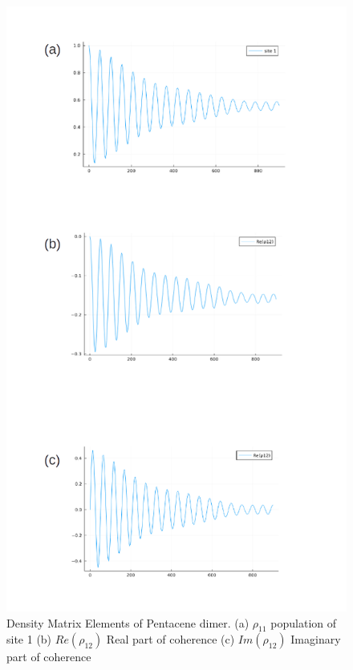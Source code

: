 \begin{figure}[h]
\centering
\includegraphics[scale=0.4]{Figures/pentacene_result}
\caption{Density Matrix Elements of Pentacene dimer. (a) $\rho_{11}$ population of site 1 (b) $Re(\rho_{12})$ Real part of coherence (c) $Im(\rho_{12})$ Imaginary part of coherence}
\end{figure}




